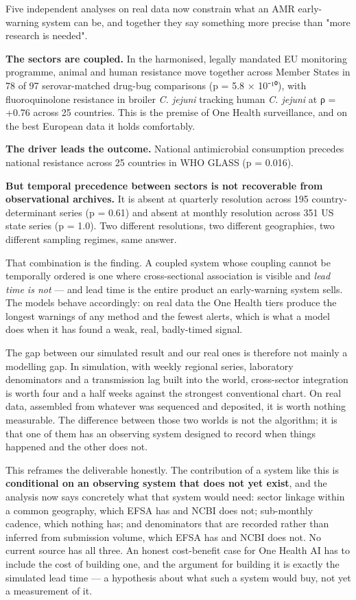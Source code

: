 \documentclass[11pt,a4paper]{article}
\begin{document}
Five independent analyses on real data now constrain what an AMR early-warning system can be, and together they say something more precise than "more research is needed".

\textbf{The sectors are coupled.} In the harmonised, legally mandated EU monitoring programme, animal and human resistance move together across Member States in 78 of 97 serovar-matched drug-bug comparisons (p = 5.8 × 10⁻¹⁰), with fluoroquinolone resistance in broiler \emph{C. jejuni} tracking human \emph{C. jejuni} at ρ = +0.76 across 25 countries. This is the premise of One Health surveillance, and on the best European data it holds comfortably.

\textbf{The driver leads the outcome.} National antimicrobial consumption precedes national resistance across 25 countries in WHO GLASS (p = 0.016).

\textbf{But temporal precedence between sectors is not recoverable from observational archives.} It is absent at quarterly resolution across 195 country-determinant series (p = 0.61) and absent at monthly resolution across 351 US state series (p = 1.0). Two different resolutions, two different geographies, two different sampling regimes, same answer.

That combination is the finding. A coupled system whose coupling cannot be temporally ordered is one where cross-sectional association is visible and \emph{lead time is not} — and lead time is the entire product an early-warning system sells. The models behave accordingly: on real data the One Health tiers produce the longest warnings of any method and the fewest alerts, which is what a model does when it has found a weak, real, badly-timed signal.

The gap between our simulated result and our real ones is therefore not mainly a modelling gap. In simulation, with weekly regional series, laboratory denominators and a transmission lag built into the world, cross-sector integration is worth four and a half weeks against the strongest conventional chart. On real data, assembled from whatever was sequenced and deposited, it is worth nothing measurable. The difference between those two worlds is not the algorithm; it is that one of them has an observing system designed to record when things happened and the other does not.

This reframes the deliverable honestly. The contribution of a system like this is \textbf{conditional on an observing system that does not yet exist}, and the analysis now says concretely what that system would need: sector linkage within a common geography, which EFSA has and NCBI does not; sub-monthly cadence, which nothing has; and denominators that are recorded rather than inferred from submission volume, which EFSA has and NCBI does not. No current source has all three. An honest cost-benefit case for One Health AI has to include the cost of building one, and the argument for building it is exactly the simulated lead time — a hypothesis about what such a system would buy, not yet a measurement of it.
\end{document}
